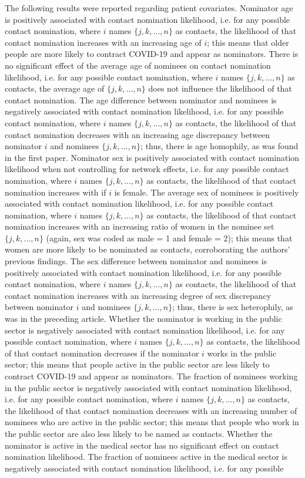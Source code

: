 The following results were reported regarding patient covariates. Nominator age is positively associated with contact nomination likelihood, i.e. for any possible contact nomination, where $i$ names $\{j,k,...,n\}$ as contacts, the likelihood of that contact nomination increases with an increasing age of $i$; this means that older people are more likely to contract COVID-19 and appear as nominators. There is no significant effect of the average age of nominees on contact nomination likelihood, i.e. for any possible contact nomination, where $i$ names $\{j,k,...,n\}$ as contacts, the average age of $\{j,k,...,n\}$ does not influence the likelihood of that contact nomination. The age difference between nominator and nominees is negatively associated with contact nomination likelihood, i.e. for any possible contact nomination, where $i$ names $\{j,k,...,n\}$ as contacts, the likelihood of that contact nomination decreases with an increasing age discrepancy between nominator $i$ and nominees $\{j,k,...,n\}$; thus, there is age homophily, as was found in the first paper. Nominator sex is positively associated with contact nomination likelihood when not controlling for network effects, i.e. for any possible contact nomination, where $i$ names $\{j,k,...,n\}$ as contacts, the likelihood of that contact nomination increases with if $i$ is female. The average sex of nominees is positively associated with contact nomination likelihood, i.e. for any possible contact nomination, where $i$ names $\{j,k,...,n\}$ as contacts, the likelihood of that contact nomination increases with an increasing ratio of women in the nominee set $\{j,k,...,n\}$ (again, sex was coded as male = 1 and female = 2); this means that women are more likely to be nominated as contacts, corroborating the authors' previous findings. The sex difference between nominator and nominees is positively associated with contact nomination likelihood, i.e. for any possible contact nomination, where $i$ names $\{j,k,...,n\}$ as contacts, the likelihood of that contact nomination increases with an increasing degree of sex discrepancy between nominator $i$ and nominees $\{j,k,...,n\}$; thus, there is sex heterophily, as was in the preceding article. Whether the nominator is working in the public sector is negatively associated with contact nomination likelihood, i.e. for any possible contact nomination, where $i$ names $\{j,k,...,n\}$ as contacts, the likelihood of that contact nomination decreases if the nominator $i$ works in the public sector; this means that people active in the public sector are less likely to contract COVID-19 and appear as nominators. The fraction of nominees working in the public sector is negatively associated with contact nomination likelihood, i.e. for any possible contact nomination, where $i$ names $\{j,k,...,n\}$ as contacts, the likelihood of that contact nomination decreases with an increasing number of nominees who are active in the public sector; this means that people who work in the public sector are also less likely to be named as contacts. Whether the nominator is active in the medical sector has no significant effect on contact nomination likelihood. The fraction of nominees active in the medical sector is negatively associated with contact nomination likelihood, i.e. for any possible 